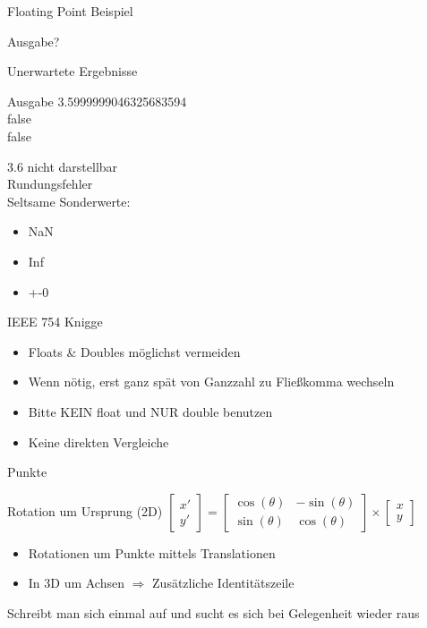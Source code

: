 \begin{frame}{Floating Point Beispiel}
	\lstset{
		language=C++,
		tabsize=2
	}
	
	Ausgabe?
\end{frame}

\begin{frame}{Unerwartete Ergebnisse}
	\begin{exampleblock}{Ausgabe}
		3.5999999046325683594 \\
		false\\
		false
	\end{exampleblock}
	3.6 nicht darstellbar \\
	Rundungsfehler \\
	Seltsame Sonderwerte:
	\begin{itemize}
		\item NaN
		\item Inf
		\item +-0
	\end{itemize}
\end{frame}

\begin{frame}{IEEE 754 Knigge}
	\begin{itemize}
		\item Floats \& Doubles möglichst vermeiden
		\item Wenn nötig, erst ganz spät von Ganzzahl zu Fließkomma wechseln
		\item Bitte KEIN float und NUR double benutzen
		\item Keine direkten Vergleiche
	\end{itemize}
\end{frame}

\begin{frame}{Punkte}
	\begin{block}{Rotation um Ursprung (2D)}
		$
		\begin{bmatrix}
			x'\\
			y'
		\end{bmatrix}
		=
		\begin{bmatrix}
			\cos(\theta) & -\sin(\theta)\\
			\sin(\theta) & \cos(\theta)
		\end{bmatrix}
		\times
		\begin{bmatrix}
			x\\
			y
		\end{bmatrix}
		$
	\end{block}
	\begin{itemize}
		\item Rotationen um Punkte mittels Translationen
		\item In 3D um Achsen $\Rightarrow$ Zusätzliche Identitätszeile
	\end{itemize}
	
	Schreibt man sich einmal auf und sucht es sich bei Gelegenheit wieder raus
\end{frame}
